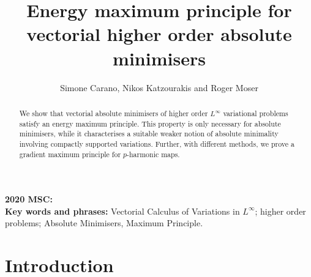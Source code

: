 \documentclass[a4paper,11pt]{article}
\title{Energy maximum principle for vectorial higher order absolute minimisers
}
\author{
Simone Carano, Nikos Katzourakis and Roger Moser}
\numberwithin{equation}{section}
\theoremstyle{definition}
\begin{document}
\maketitle

\begin{abstract} 
We show that vectorial absolute minimisers of higher order $L^\infty$ variational problems satisfy an energy maximum principle. This property is only necessary for absolute minimisers, while it characterises a suitable weaker notion of absolute minimality involving compactly supported variations. Further, with different methods, we prove a gradient maximum principle for $p$-harmonic maps.
\end{abstract}
{\bf 2020 MSC:}\\
{\bf Key words and phrases:} Vectorial Calculus of Variations in $L^\infty$; higher order problems; Absolute Minimisers, Maximum Principle.

\section{Introduction}\label{sec:introduction}
\end{document}
